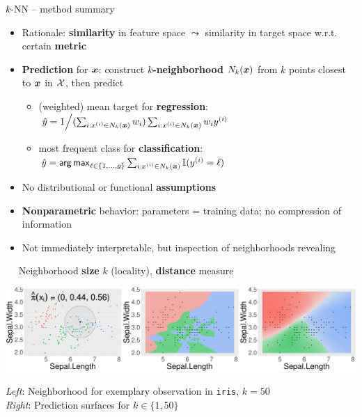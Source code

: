 \begin{frame}{$k$-NN -- method summary}

 
 

\medskip

\begin{itemize}
  \item Rationale: \textbf{similarity} in feature space $\leadsto$ similarity 
  in target space w.r.t. certain \textbf{metric}
  \item \textbf{Prediction} for $\bm{x}$: construct \textbf{$k$-neighborhood} 
  $N_k(\bm{x})$ from $k$ points closest to $\bm{x}$ in $\mathcal{X}$, then 
  predict
  \begin{itemize}
    \footnotesize
    \item (weighted) mean target for \textbf{regression}: 
    $\left. \hat{y} = 1 \middle/ 
    (\sum_{i: x^{(i)} \in N_k(\bm{x})} w_i) \sum_{i: x^{(i)} \in N_k(\bm{x})} w_i y^{(i)} \right.$
    \item most frequent class for \textbf{classification}: 
    $\hat{y} = \mathop{\sf arg\,max}_{\ell \in \{1, \ldots, g\}} \sum_{i: x^{(i)} \in N_k(\bm{x})} \mathbb{I}(y^{(i)} = \ell)$
  \end{itemize}
  \item No distributional or functional \textbf{assumptions}
  \item \textbf{Nonparametric} behavior: parameters = training data; no 
  compression of information
  \item Not immediately interpretable, but inspection of neighborhoods revealing
\end{itemize}

\medskip

 ~~ Neighborhood \textbf{size} $k$ (locality), 
\textbf{distance} measure

\vfill

\begin{minipage}{0.7\textwidth}
  \includegraphics[width=\textwidth]{figure/knn-neighborhood.pdf}
\end{minipage}%
\hfill
\begin{minipage}{0.25\textwidth}
  \tiny
  \raggedright
  \textit{Left}: Neighborhood for exemplary observation in \texttt{iris}, 
  $k = 50$ \\
  \textit{Right}: Prediction surfaces for $k \in \{1, 50\}$
\end{minipage}
\end{frame}

